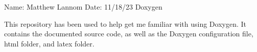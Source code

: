 Name\+: Matthew Lannom Date\+: 11/18/23 Doxygen

This repository has been used to help get me familiar with using Doxygen. It contains the documented source code, as well as the Doxygen configuration file, html folder, and latex folder. 